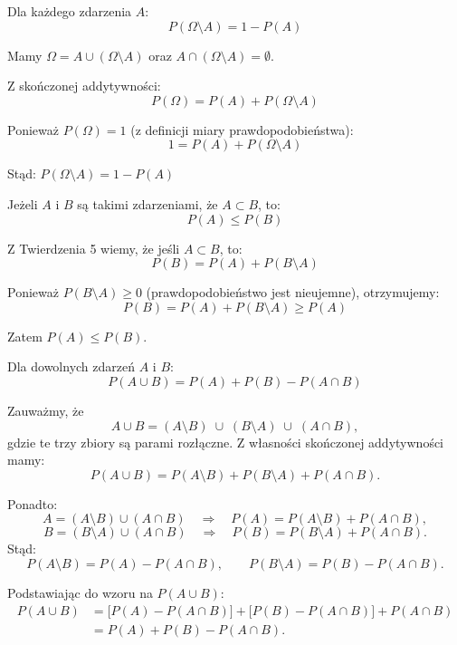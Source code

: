 \documentclass[final,a4paper,openany,12pt]{mwbk}
\begin{document}
\begin{Tw}
Dla każdego zdarzenia $A$:
$$P(\Omega \setminus A) = 1 - P(A)$$
\end{Tw}

\begin{Dow}
Mamy $\Omega = A \cup (\Omega \setminus A)$ oraz $A \cap (\Omega \setminus A) = \emptyset$.

Z skończonej addytywności:
$$P(\Omega) = P(A) + P(\Omega \setminus A)$$

Ponieważ $P(\Omega) = 1$ (z definicji miary prawdopodobieństwa):
$$1 = P(A) + P(\Omega \setminus A)$$

Stąd: $P(\Omega \setminus A) = 1 - P(A)$
\end{Dow}

\begin{Tw}
Jeżeli $A$ i $B$ są takimi zdarzeniami, że $A \subset B$, to:
$$P(A) \leq P(B)$$
\end{Tw}

\begin{Dow}
Z Twierdzenia 5 wiemy, że jeśli $A \subset B$, to:
$$P(B) = P(A) + P(B \setminus A)$$

Ponieważ $P(B \setminus A) \geq 0$ (prawdopodobieństwo jest nieujemne), otrzymujemy:
$$P(B) = P(A) + P(B \setminus A) \geq P(A)$$

Zatem $P(A) \leq P(B)$.
\end{Dow}

\begin{Tw}
Dla dowolnych zdarzeń $A$ i $B$:
$$P(A \cup B) = P(A) + P(B) - P(A \cap B)$$
\end{Tw}

\begin{Dow}
Zauważmy, że
\[
A\cup B = (A\setminus B)\;\cup\;(B\setminus A)\;\cup\;(A\cap B),
\]
gdzie te trzy zbiory są parami rozłączne. Z własności skończonej addytywności mamy:
\[
P(A\cup B)
= P(A\setminus B) + P(B\setminus A) + P(A\cap B).
\]

Ponadto:
\[
A = (A\setminus B)\cup(A\cap B)
\quad\Longrightarrow\quad
P(A) = P(A\setminus B) + P(A\cap B),
\]
\[
B = (B\setminus A)\cup(A\cap B)
\quad\Longrightarrow\quad
P(B) = P(B\setminus A) + P(A\cap B).
\]
Stąd:
\[
P(A\setminus B) = P(A) - P(A\cap B),
\qquad
P(B\setminus A) = P(B) - P(A\cap B).
\]

Podstawiając do wzoru na \(P(A\cup B)\):
\[
\begin{aligned}
P(A\cup B)
&= \bigl[P(A) - P(A\cap B)\bigr]
  + \bigl[P(B) - P(A\cap B)\bigr]
  + P(A\cap B)\\
&= P(A) + P(B) - P(A\cap B).
\end{aligned}
\]
\end{Dow}
\end{document}
